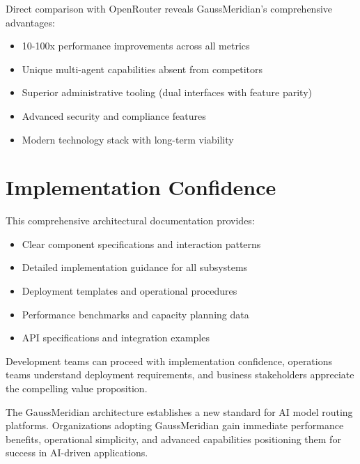 \documentclass[12pt,a4paper,twoside]{report}
\begin{document}
Direct comparison with OpenRouter reveals GaussMeridian's comprehensive advantages:

\begin{itemize}[leftmargin=*]
    \item 10-100x performance improvements across all metrics
    \item Unique multi-agent capabilities absent from competitors
    \item Superior administrative tooling (dual interfaces with feature parity)
    \item Advanced security and compliance features
    \item Modern technology stack with long-term viability
\end{itemize}

\section*{Implementation Confidence}

This comprehensive architectural documentation provides:

\begin{itemize}[leftmargin=*]
    \item Clear component specifications and interaction patterns
    \item Detailed implementation guidance for all subsystems
    \item Deployment templates and operational procedures
    \item Performance benchmarks and capacity planning data
    \item API specifications and integration examples
\end{itemize}

Development teams can proceed with implementation confidence, operations teams understand deployment requirements, and business stakeholders appreciate the compelling value proposition.

\vspace{1cm}

The GaussMeridian architecture establishes a new standard for AI model routing platforms. Organizations adopting GaussMeridian gain immediate performance benefits, operational simplicity, and advanced capabilities positioning them for success in AI-driven applications.

\vfill
\end{document}
